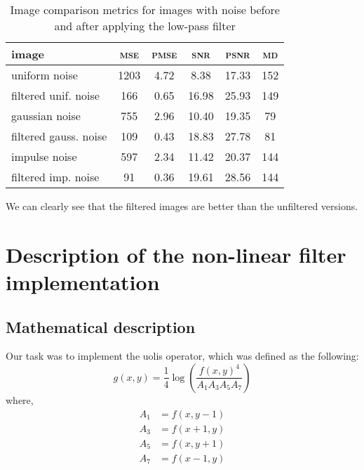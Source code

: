 \documentclass[12pt]{article}
\begin{document}
\begin{table}[H]\centering
    \begin{tabular}{l|ccccc}
        \toprule
        image                 & \textsc{mse} & \textsc{pmse} & \textsc{snr} & \textsc{psnr} & \textsc{md} \\
        \midrule[.5pt]
        uniform noise         & 1203         & 4.72          & 8.38         & 17.33         & 152         \\
        filtered unif. noise  & 166          & 0.65          & 16.98        & 25.93         & 149         \\
        \midrule[.1pt]
        gaussian noise        & 755          & 2.96          & 10.40        & 19.35         & 79          \\
        filtered gauss. noise & 109          & 0.43          & 18.83        & 27.78         & 81          \\
        \midrule[.1pt]
        impulse noise         & 597          & 2.34          & 11.42        & 20.37         & 144         \\
        filtered imp. noise   & 91           & 0.36          & 19.61        & 28.56         & 144         \\
        \bottomrule
    \end{tabular}
    \caption{Image comparison metrics for images with noise before and after applying the low-pass filter}
    \label{tab:lowpass-results-noise}
\end{table}

We can clearly see that the filtered images are better than the unfiltered versions.


\pagebreak[3]
\section{Description of the non-linear filter implementation }

\subsection{Mathematical description}

Our task was to implement the uolis operator, which was defined as the following:
\begin{equation}
    g(x,y) = \frac{1}{4} \log \left(
    \frac{f(x,y)^4}{A_1 A_3 A_5 A_7}
    \right)
    \label{eq:uolis}
\end{equation}
where,
\begin{align*}
    A_1 & = f(x,y-1) \\
    A_3 & = f(x+1,y) \\
    A_5 & = f(x,y+1) \\
    A_7 & = f(x-1,y)
\end{align*}
\end{document}
